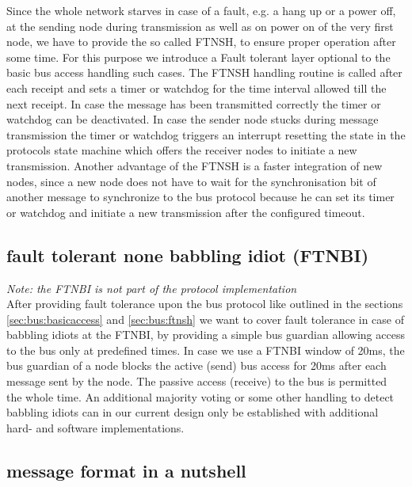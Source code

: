 Since the whole network starves in case of a fault, e.g. a hang up or a power off, at the sending node during transmission as well as on power on of the very first node, we have to provide the so called FTNSH, to ensure proper operation after some time.
For this purpose we introduce a Fault tolerant layer optional to the basic bus access handling such cases. The FTNSH handling routine is called after each receipt and sets a timer or watchdog for the time interval allowed till the next receipt.
In case the message has been transmitted correctly the timer or watchdog can be deactivated.
In case the sender node stucks during message transmission the timer or watchdog triggers an interrupt resetting the state in the protocols state machine which offers the receiver nodes to initiate a new transmission.
Another advantage of the FTNSH is a faster integration of new nodes, since a new node does not have to wait for the synchronisation bit of another message to synchronize to the bus protocol because he can set its timer or watchdog and initiate a new transmission after the configured timeout.

\subsection {fault tolerant none babbling idiot (FTNBI)}
\label{sec:bus:ftnbi}

\textit{Note: the FTNBI is not part of the protocol implementation}\\

After providing fault tolerance upon the bus protocol like outlined in the sections \ref{sec:bus:basicaccess} and \ref{sec:bus:ftnsh} we want to cover fault tolerance in case of babbling idiots at the FTNBI, by providing a simple bus guardian allowing access to the bus only at predefined times.
In case we use a FTNBI window of 20ms, the bus guardian of a node blocks the active (send) bus access for 20ms after each message sent by the node. The passive access (receive) to the bus is permitted the whole time. An additional majority voting or some other handling to detect babbling idiots can in our current design only be established with additional hard- and software implementations.


\subsection{message format in a nutshell}
\label{sec:bus:messageformat}

